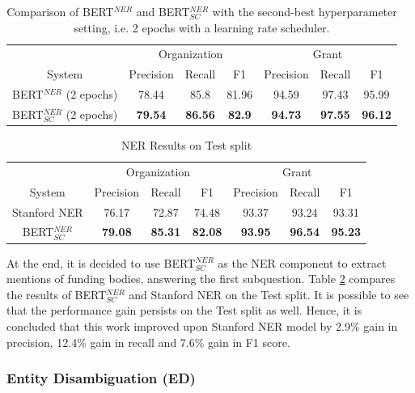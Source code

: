 \documentclass{report}
\theoremstyle{definition}
\theoremstyle{remark}
\begin{document}
\begin{table}
    \centering
    \begin{tabular}{c| c c c| c c c}
    &\multicolumn{3}{c|}{Organization}&\multicolumn{3}{c}{Grant} \\
    System&Precision&Recall&F1&Precision&Recall&F1\\
    \hline
    BERT$^{NER}$ (2 epochs) &  78.44&85.8&81.96&94.59&97.43&95.99
 \\[0.7ex]
    BERT$^{NER}_{SC}$ (2 epochs) &  \textbf{79.54}&\textbf{86.56}&\textbf{82.9}&\textbf{94.73}&\textbf{97.55}&\textbf{96.12}
  \\[0.7ex]
    \end{tabular}
    \caption{Comparison of BERT$^{NER}$ and BERT$^{NER}_{SC}$ with the second-best hyperparameter setting, i.e. 2 epochs with a learning rate scheduler.}
    \label{tab:bertsccompareother}
\end{table}

\begin{table}
    \centering
    \begin{tabular}{c| c c c| c c c}
    &\multicolumn{3}{c|}{Organization}&\multicolumn{3}{c}{Grant} \\
    System&Precision&Recall&F1&Precision&Recall&F1\\
    \hline
    Stanford NER &  76.17 & 72.87  & 74.48 & 93.37   & 93.24  & 93.31
 \\[0.7ex]
    BERT$^{NER}_{SC}$ &  \textbf{79.08} & \textbf{85.31} & \textbf{82.08}& \textbf{93.95}&   \textbf{96.54}&   \textbf{95.23}
  \\[0.7ex]
    \end{tabular}
    \caption{NER Results on Test split}
    \label{tab:all_ner_results_test}
\end{table}

At the end, it is decided to use BERT$^{NER}_{SC}$ as the NER component to extract mentions of funding bodies, answering the first subquestion. Table \ref{tab:all_ner_results_test} compares the results of BERT$^{NER}_{SC}$ and Stanford NER on the Test split. It is possible to see that the performance gain persists on the Test split as well. Hence, it is concluded that this work improved upon Stanford NER model by 2.9\% gain in precision, 12.4\% gain in recall and 7.6\% gain in F1 score.
\subsubsection{Entity Disambiguation (ED)}
\end{document}
